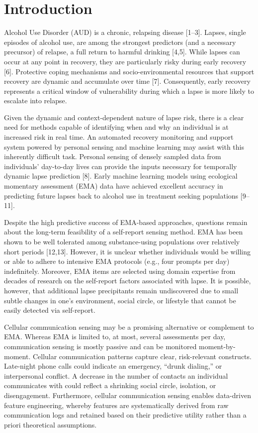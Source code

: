 \documentclass[
  letterpaper,
  DIV=11,
  numbers=noendperiod]{scrartcl}
\begin{document}
\section{Introduction}\label{introduction}

Alcohol Use Disorder (AUD) is a chronic, relapsing disease {[}1--3{]}.
Lapses, single episodes of alcohol use, are among the strongest
predictors (and a necessary precursor) of relapse, a full return to
harmful drinking {[}4,5{]}. While lapses can occur at any point in
recovery, they are particularly risky during early recovery {[}6{]}.
Protective coping mechanisms and socio-environmental resources that
support recovery are dynamic and accumulate over time {[}7{]}.
Consequently, early recovery represents a critical window of
vulnerability during which a lapse is more likely to escalate into
relapse.

Given the dynamic and context-dependent nature of lapse risk, there is a
clear need for methods capable of identifying when and why an individual
is at increased risk in real time. An automated recovery monitoring and
support system powered by personal sensing and machine learning may
assist with this inherently difficult task. Personal sensing of densely
sampled data from individuals' day-to-day lives can provide the inputs
necessary for temporally dynamic lapse prediction {[}8{]}. Early machine
learning models using ecological momentary assessment (EMA) data have
achieved excellent accuracy in predicting future lapses back to alcohol
use in treatment seeking populations {[}9--11{]}.

Despite the high predictive success of EMA-based approaches, questions
remain about the long-term feasibility of a self-report sensing method.
EMA has been shown to be well tolerated among substance-using
populations over relatively short periods {[}12,13{]}. However, it is
unclear whether individuals would be willing or able to adhere to
intensive EMA protocols (e.g., four prompts per day) indefinitely.
Moreover, EMA items are selected using domain expertise from decades of
research on the self-report factors associated with lapse. It is
possible, however, that additional lapse precipitants remain
undiscovered due to small subtle changes in one's environment, social
circle, or lifestyle that cannot be easily detected via self-report.

Cellular communication sensing may be a promising alternative or
complement to EMA. Whereas EMA is limited to, at most, several
assessments per day, communication sensing is mostly passive and can be
monitored moment-by-moment. Cellular communication patterns capture
clear, risk-relevant constructs. Late-night phone calls could indicate
an emergency, ``drunk dialing,'' or interpersonal conflict. A decrease
in the number of contacts an individual communicates with could reflect
a shrinking social circle, isolation, or disengagement. Furthermore,
cellular communication sensing enables data-driven feature engineering,
whereby features are systematically derived from raw communication logs
and retained based on their predictive utility rather than a priori
theoretical assumptions.
\end{document}
